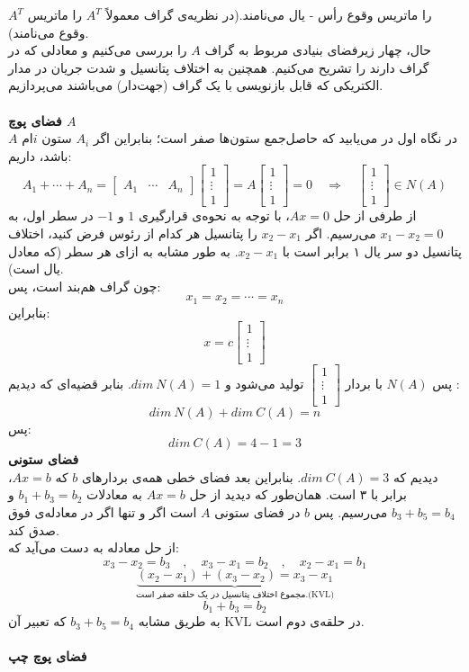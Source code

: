 $A^T$ را ماتریس وقوع رأس - یال می‌نامند.(در نظریه‌ی گراف معمولاً $A^T$ را ماتریس وقوع می‌نامند).\\
حال، چهار زیر‌فضا‌ی بنیادی مربوط به گراف $A$ را بررسی می‌کنیم و معادلی که در گراف دارند را تشریح می‌کنیم. همچنین به اختلاف پتانسیل و شدت جریان در مدار الکتریکی که قابل بازنویسی با یک گراف (جهت‌دار) می‌باشند می‌پردازیم.\\\\
\textbf{فضا‌ی پوچ $A$}\\
در نگاه اول در‌ می‌یابید که حاصل‌جمع ستون‌ها صفر است؛ بنابراین اگر $A_i$ ستون $i$ام $A$ باشد، داریم:
$$A_1+\cdots+A_n= \begin{bmatrix}
A_1 & \cdots & A_n
\end{bmatrix}\begin{bmatrix}
1 \\ \vdots \\ 1
\end{bmatrix}=A\begin{bmatrix}
1 \\ \vdots \\ 1
\end{bmatrix}=0 \quad\Rightarrow\quad \begin{bmatrix}
1 \\ \vdots \\ 1
\end{bmatrix} \in N(A)$$
از طرفی از حل $Ax=0$، با توجه به نحوه‌ی قرارگیری $1$ و $-1$ در سطر اول، به $x_1-x_2=0$ می‌رسیم. اگر $x_2-x_1$ را پتانسیل هر کدام از رئوس فرض کنید، اختلاف پتانسیل دو سر یال ۱ برابر است با $x_2-x_1$. به طور مشابه به ازای هر سطر (که معادل یال است). \\
چون گراف هم‌بند است، پس:
$$x_1=x_2=\cdots=x_n$$ 
بنابراین:
$$x = c\begin{bmatrix}
1 \\ \vdots \\ 1
\end{bmatrix}$$
پس $N(A)$ با بردار $\begin{bmatrix}
1 \\ \vdots \\ 1
\end{bmatrix}$ تولید می‌شود و $dim \: N(A)=1$. بنابر قضیه‌ای که دیدیم :
$$dim\:N(A)+dim\:C(A) = n$$
پس:
$$dim\:C(A)=4-1=3$$
\textbf{فضا‌ی ستونی}\\
دیدیم که $dim \: C(A) = 3$. بنابراین بعد فضا‌ی خطی همه‌ی بردار‌های $b$ که $Ax=b$، برابر با ۳ است. همان‌طور که دیدید از حل $Ax = b$ به معادلات $b_1+b_3=b_2$ و $b_3+b_5=b_4$ می‌رسیم. پس $b$ در فضا‌ی ستونی $A$ است اگر و تنها اگر در معادله‌ی فوق صدق کند.\\
از حل معادله به دست می‌آید که:
$$x_3-x_2=b_3\quad , \quad x_3-x_1= b_2 \quad , \quad x_2-x_1 = b_1$$
$$\underbrace{(x_2-x_1) +(x_3-x_2)=x_3-x_1}_\text{مجموع اختلاف پتانسیل در یک حلقه صفر است.(KVL)} $$
$$b_1+b_3=b_2$$
به طریق مشابه $b_3+b_5=b_4$ که تعبیر آن KVL در حلقه‌ی دوم است.\\\\
\textbf{فضا‌ی پوچ چپ}

